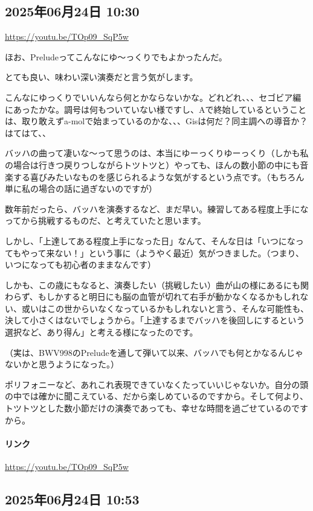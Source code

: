 \subsection*{2025年06月24日 10:30}

\url{https://youtu.be/TOp09_SqP5w}

ほお、Preludeってこんなにゆ〜っくりでもよかったんだ。

とても良い、味わい深い演奏だと言う気がします。

こんなにゆっくりでいいんなら何とかならないかな。どれどれ、、、セゴビア編にあったかな。調号は何もついていない様ですし、Aで終始しているということは、取り敢えずa-molで始まっているのかな、、、Gisは何だ？同主調への導音か？はてはて、、

バッハの曲って凄いな〜って思うのは、本当にゆーっくりゆーっくり（しかも私の場合は行きつ戻りつしながらトツトツと）やっても、ほんの数小節の中にも音楽する喜びみたいなものを感じられるような気がするという点です。（もちろん単に私の場合の話に過ぎないのですが）

数年前だったら、バッハを演奏するなど、まだ早い。練習してある程度上手になってから挑戦するものだ、と考えていたと思います。

しかし、「上達してある程度上手になった日」なんて、そんな日は「いつになってもやって来ない！」という事に（ようやく最近）気がつきました。（つまり、いつになっても初心者のままなんです）

しかも、この歳にもなると、演奏したい（挑戦したい）曲が山の様にあるにも関わらず、もしかすると明日にも脳の血管が切れて右手が動かなくなるかもしれない、或いはこの世からいなくなっているかもしれないと言う、そんな可能性も、決して小さくはないでしょうから。「上達するまでバッハを後回しにするという選択など、あり得ん」と考える様になったのです。

（実は、BWV998のPreludeを通して弾いて以来、バッハでも何とかなるんじゃないかと思うようになった。）

ポリフォニーなど、あれこれ表現できていなくたっていいじゃないか。自分の頭の中では確かに聞こえている、だから楽しめているのですから。そして何より、トツトツとした数小節だけの演奏であっても、幸せな時間を過ごせているのですから。

\paragraph{リンク}
\url{https://youtu.be/TOp09_SqP5w}

\subsection*{2025年06月24日 10:53}


